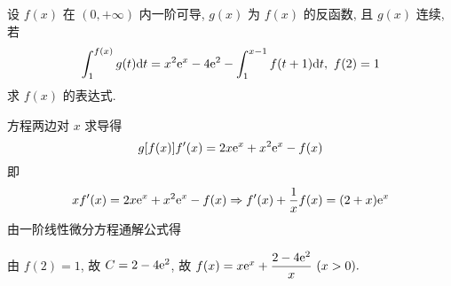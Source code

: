 \begin{example}
    设 $f(x)$ 在 $(0,+\infty)$ 内一阶可导, $g(x)$ 为 $f(x)$ 的反函数, 且 $g(x)$ 连续, 若
    $$\int_{1}^{f(x)}g(t)\dd t=x^2\mathrm{e} ^x-4\mathrm{e} ^2-\int_{1}^{x-1}f(t+1)\dd t,~f(2)=1$$
    求 $f(x)$ 的表达式.
\end{example}
\begin{solution}
    方程两边对 $x$ 求导得 $$g[f(x)]f'(x)=2x\mathrm{e} ^x+x^2\mathrm{e} ^x-f(x)$$
    即 $$xf'(x)=2x\mathrm{e} ^x+x^2\mathrm{e} ^x-f(x)\Rightarrow f'(x)+\dfrac{1}{x}f(x)=(2+x)\mathrm{e} ^x$$
    由一阶线性微分方程通解公式得
    由 $f(2)=1$, 故 $C=2-4\mathrm{e} ^2$, 故 $f(x)=x\mathrm{e} ^x+\dfrac{2-4\mathrm{e} ^2}{x}~ (x>0).$
\end{solution}

